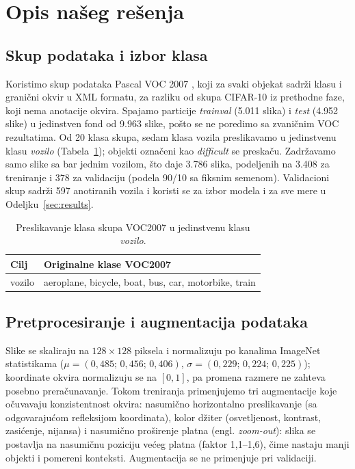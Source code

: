 \documentclass[11pt,a4paper]{article}
\begin{document}
\section{Opis našeg rešenja}

\subsection{Skup podataka i izbor klasa}

Koristimo skup podataka Pascal VOC 2007 \cite{everingham2010voc}, koji za svaki
objekat sadrži klasu i granični okvir u XML formatu, za razliku od skupa
CIFAR-10 iz prethodne faze, koji nema anotacije okvira. Spajamo particije
\emph{trainval} (5.011 slika) i \emph{test} (4.952 slike) u jedinstven fond od
9.963 slike, pošto se ne poredimo sa zvaničnim VOC rezultatima. Od 20 klasa
skupa, sedam klasa vozila preslikavamo u jedinstvenu klasu \emph{vozilo}
(Tabela~\ref{tab:classes}); objekti označeni kao \emph{difficult} se
preskaču. Zadržavamo samo slike sa bar jednim vozilom, što daje 3.786
slika, podeljenih na 3.408 za treniranje i 378 za validaciju (podela 90/10 sa
fiksnim semenom). Validacioni skup sadrži 597 anotiranih vozila i koristi se
za izbor modela i za sve mere u Odeljku~\ref{sec:results}.

\begin{table}[ht]
\centering
\caption{Preslikavanje klasa skupa VOC2007 u jedinstvenu klasu \emph{vozilo}.}
\label{tab:classes}
\begin{tabular}{ll}
\toprule
\textbf{Cilj} & \textbf{Originalne klase VOC2007} \\
\midrule
vozilo & aeroplane, bicycle, boat, bus, car, motorbike, train \\
\bottomrule
\end{tabular}
\end{table}

\subsection{Pretprocesiranje i augmentacija podataka}

Slike se skaliraju na $128\times128$ piksela i normalizuju po kanalima
ImageNet statistikama ($\mu=(0{,}485;\,0{,}456;\,0{,}406)$,
$\sigma=(0{,}229;\,0{,}224;\,0{,}225)$); koordinate okvira normalizuju se na
$[0,1]$, pa promena razmere ne zahteva posebno preračunavanje. Tokom
treniranja primenjujemo tri augmentacije koje očuvavaju konzistentnost okvira:
nasumično horizontalno preslikavanje (sa odgovarajućom refleksijom
koordinata), kolor džiter (osvetljenost, kontrast, zasićenje, nijansa) i
nasumično proširenje platna (engl. \emph{zoom-out}): slika se postavlja na
nasumičnu poziciju većeg platna (faktor 1,1--1,6), čime nastaju manji
objekti i pomereni konteksti. Augmentacija se ne primenjuje pri validaciji.
\end{document}
